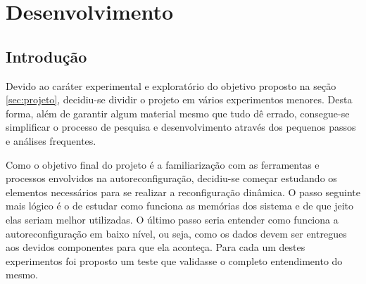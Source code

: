 \documentclass[11pt,a4paper,oneside]{book}
\begin{document}
	\frontmatter
	\listoftodos
	\tableofcontents
	\mainmatter
	
	\newcommand\dlq{\lq\lq{}}
	\newcommand\drq{\rq\rq{}}
	\newcommand\qt[1]{\lq\lq{}#1\rq\rq{}}
	\newcommand\qti[1]{\lq\lq{}\textit{#1}\rq\rq{}}
\fi

                      
\chapter{Desenvolvimento}\label{CapDesenvolvimento}


\section{Introdu\c{c}\~{a}o}
Devido ao caráter experimental e exploratório do objetivo proposto na seção \ref{sec:projeto}, decidiu-se dividir o projeto em vários experimentos menores.
Desta forma, além de garantir algum material mesmo que tudo dê errado, consegue-se simplificar o processo de pesquisa e desenvolvimento através dos pequenos passos e análises frequentes.

Como o objetivo final do projeto é a familiarização com as ferramentas e processos envolvidos na autoreconfiguração, decidiu-se começar estudando os elementos necessários para se realizar a reconfiguração dinâmica.
O passo seguinte mais lógico é o de estudar como funciona as memórias dos sistema e de que jeito elas seriam melhor utilizadas.
O último passo seria entender como funciona a autoreconfiguração em baixo nível, ou seja, como os dados devem ser entregues aos devidos componentes para que ela aconteça.
Para cada um destes experimentos foi proposto um teste que validasse o completo entendimento do mesmo.
\end{document}
